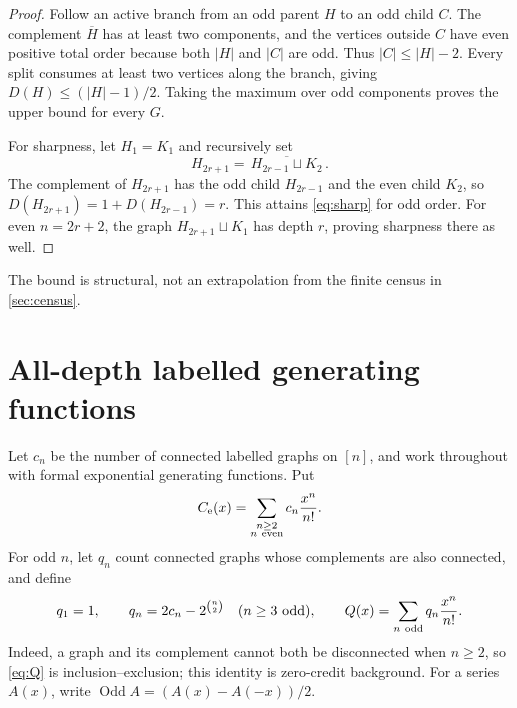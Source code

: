 \documentclass[10pt,a4paper]{amsart}
\theoremstyle{definition}
\theoremstyle{remark}
\newcommand{\Odd}{\operatorname{Odd}}
\begin{document}
\begin{proof}
Follow an active branch from an odd parent \(H\) to an odd child \(C\). The
complement \(\overline H\) has at least two components, and the vertices
outside \(C\) have even positive total order because both \(|H|\) and \(|C|\)
are odd. Thus \(|C|\leq |H|-2\). Every split consumes at least two vertices
along the branch, giving \(D(H)\leq (|H|-1)/2\). Taking the maximum over odd
components proves the upper bound for every \(G\).

For sharpness, let \(H_1=K_1\) and recursively set
\begin{equation}
                  H_{2r+1}=\overline{\,H_{2r-1}\sqcup K_2\,}.
\end{equation}
The complement of \(H_{2r+1}\) has the odd child \(H_{2r-1}\) and the even
child \(K_2\), so \(D(H_{2r+1})=1+D(H_{2r-1})=r\). This attains
\eqref{eq:sharp} for odd order. For even \(n=2r+2\), the graph
\(H_{2r+1}\sqcup K_1\) has depth \(r\), proving sharpness there as well.
\end{proof}

The bound is structural, not an extrapolation from the finite census in
\cref{sec:census}.

\section{All-depth labelled generating functions}

Let \(c_n\) be the number of connected labelled graphs on \([n]\), and work
throughout with formal exponential generating functions. Put
\begin{equation}
 C_{\mathrm e}(x)=\sum_{\substack{n\geq2\\n\ {\rm even}}}
 c_n\frac{x^n}{n!}.
\end{equation}
For odd \(n\), let \(q_n\) count connected graphs whose complements are also
connected, and define
\begin{equation}
 q_1=1,\qquad q_n=2c_n-2^{\binom n2}\quad(n\geq3\text{ odd}),\qquad
 Q(x)=\sum_{n\ {\rm odd}}q_n\frac{x^n}{n!}.               \label{eq:Q}
\end{equation}
Indeed, a graph and its complement cannot both be disconnected when
\(n\geq2\), so \eqref{eq:Q} is inclusion--exclusion; this identity is
zero-credit background. For a series \(A(x)\), write
\(\Odd A=(A(x)-A(-x))/2\).
\end{document}
